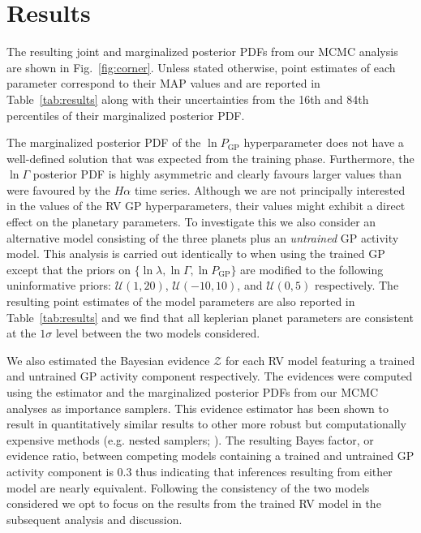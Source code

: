\documentclass[longauth]{aa}
\begin{document}
\section{Results}
\label{sec:results} 
The resulting joint and marginalized posterior PDFs from our MCMC analysis are shown in Fig.~\ref{fig:corner}. Unless stated otherwise, point estimates of each parameter correspond to their MAP values and are reported in Table~\ref{tab:results} along with their uncertainties from the 16th and 84th percentiles of their marginalized posterior PDF.

\begin{figure*}
    \centering
    \caption{The marginalized and joint posterior probability density functions of the model parameters from our L 98-59 RV analysis using a model that includes a trained GP activity model plus three keplerian planet solutions (see Sect.~\ref{sec:rvmodel}).}
    \label{fig:corner}
\end{figure*}

The marginalized posterior PDF of the $\ln{P_{\text{GP}}}$ hyperparameter does not have a well-defined solution that was expected from the training phase. Furthermore, the $\ln{\Gamma}$ posterior PDF is highly asymmetric and clearly favours larger values than were favoured by the $H\alpha$ time series. Although we are not principally interested in the values of the RV GP hyperparameters, their values might exhibit a direct effect on the planetary parameters. To investigate this we also consider an alternative model consisting of the three planets plus an \emph{untrained} GP activity model. This analysis is carried out identically to when using the trained GP except that the priors on $\{ \ln{\lambda}, \ln{\Gamma}, \ln{P_{\text{GP}}} \}$ are modified to the following uninformative priors: $\mathcal{U}(1,20)$, $\mathcal{U}(-10,10)$, and $\mathcal{U}(0,5)$ respectively. The resulting point estimates of the model parameters are also reported in Table~\ref{tab:results} and we find that all keplerian planet parameters are consistent at the $1\sigma$ level between the two models considered. 

We also estimated the Bayesian evidence $\mathcal{Z}$ for each RV model featuring a trained and untrained GP activity component respectively. The evidences were computed using the \cite{perrakis14} estimator and the marginalized posterior PDFs from our MCMC analyses as importance samplers. This evidence estimator has been shown to result in quantitatively similar results to other more robust but computationally expensive methods (e.g. nested samplers; \citealt{nelson18}). The resulting Bayes factor, or evidence ratio, between competing models containing a trained and untrained GP activity component is 0.3 thus indicating that inferences resulting from either model are nearly equivalent. Following the consistency of the two models considered we opt to focus on the results from the trained RV model in the subsequent analysis and discussion.
\end{document}
